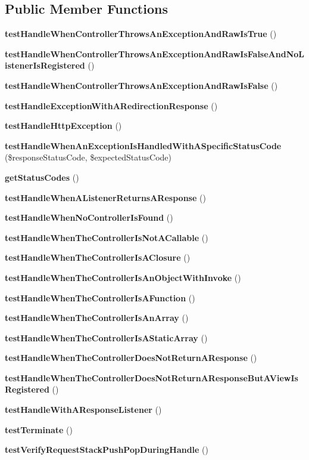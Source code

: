 \subsection*{Public Member Functions}
\begin{DoxyCompactItemize}
\item 
{\bf test\+Handle\+When\+Controller\+Throws\+An\+Exception\+And\+Raw\+Is\+True} ()
\item 
{\bf test\+Handle\+When\+Controller\+Throws\+An\+Exception\+And\+Raw\+Is\+False\+And\+No\+Listener\+Is\+Registered} ()
\item 
{\bf test\+Handle\+When\+Controller\+Throws\+An\+Exception\+And\+Raw\+Is\+False} ()
\item 
{\bf test\+Handle\+Exception\+With\+A\+Redirection\+Response} ()
\item 
{\bf test\+Handle\+Http\+Exception} ()
\item 
{\bf test\+Handle\+When\+An\+Exception\+Is\+Handled\+With\+A\+Specific\+Status\+Code} (\$response\+Status\+Code, \$expected\+Status\+Code)
\item 
{\bf get\+Status\+Codes} ()
\item 
{\bf test\+Handle\+When\+A\+Listener\+Returns\+A\+Response} ()
\item 
{\bf test\+Handle\+When\+No\+Controller\+Is\+Found} ()
\item 
{\bf test\+Handle\+When\+The\+Controller\+Is\+Not\+A\+Callable} ()
\item 
{\bf test\+Handle\+When\+The\+Controller\+Is\+A\+Closure} ()
\item 
{\bf test\+Handle\+When\+The\+Controller\+Is\+An\+Object\+With\+Invoke} ()
\item 
{\bf test\+Handle\+When\+The\+Controller\+Is\+A\+Function} ()
\item 
{\bf test\+Handle\+When\+The\+Controller\+Is\+An\+Array} ()
\item 
{\bf test\+Handle\+When\+The\+Controller\+Is\+A\+Static\+Array} ()
\item 
{\bf test\+Handle\+When\+The\+Controller\+Does\+Not\+Return\+A\+Response} ()
\item 
{\bf test\+Handle\+When\+The\+Controller\+Does\+Not\+Return\+A\+Response\+But\+A\+View\+Is\+Registered} ()
\item 
{\bf test\+Handle\+With\+A\+Response\+Listener} ()
\item 
{\bf test\+Terminate} ()
\item 
{\bf test\+Verify\+Request\+Stack\+Push\+Pop\+During\+Handle} ()
\end{DoxyCompactItemize}
